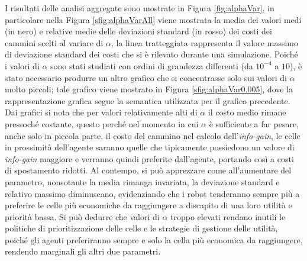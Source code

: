 I risultati delle analisi aggregate sono mostrate in Figura \ref{fig:alphaVar}, in particolare nella Figura \ref{sfig:alphaVarAll} viene mostrata la media dei valori medi (in nero) e relative medie delle deviazioni standard (in rosso) dei costi dei cammini scelti al variare di $\alpha$, la linea tratteggiata rappresenta il valore massimo di deviazione standard dei costi che si è rilevato durante una simulazione.
Poiché i valori di $\alpha$ sono stati studiati con ordini di grandezza differenti (da $10^{-4}$ a $10$), è stato necessario produrre un altro grafico che si concentrasse solo sui valori di $\alpha$ molto piccoli; tale grafico viene mostrato in Figura \ref{sfig:alphaVar0.005}, dove la rappresentazione grafica segue la semantica utilizzata per il grafico precedente.
Dai grafici si nota che per valori relativamente alti di $\alpha$ il costo medio rimane pressoché costante, questo perché nel momento in cui $\alpha$ è sufficiente a far pesare, anche solo in piccola parte, il costo del cammino nel calcolo dell'\textit{info-gain}, le celle in prossimità dell'agente saranno quelle che tipicamente possiedono un valore di \textit{info-gain} maggiore e verranno quindi preferite dall'agente, portando così a costi di spostamento ridotti.
Al contempo, si può apprezzare come all'aumentare del parametro, nonsotante la media rimanga invariata, la deviazione standard e relativo massimo diminuscano, evidenziando che i robot tenderanno sempre più a preferire le celle più economiche da raggiungere a discapito di una loro utilità e priorità bassa.
Si può dedurre che valori di $\alpha$ troppo elevati rendano inutili le politiche di prioritizzazione delle celle e le strategie di gestione delle utilità, poiché gli agenti preferiranno sempre e solo la cella più economica da raggiungere, rendendo marginali gli altri due parametri.
